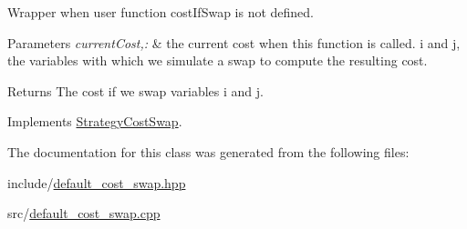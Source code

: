 \-Wrapper when user function cost\-If\-Swap is not defined. 


\begin{DoxyParams}{\-Parameters}
{\em current\-Cost,\-:} & the current cost when this function is called. i and j, the variables with which we simulate a swap to compute the resulting cost. \\
\hline
\end{DoxyParams}
\begin{DoxyReturn}{\-Returns}
\-The cost if we swap variables i and j. 
\end{DoxyReturn}


\-Implements \hyperlink{classStrategyCostSwap_a154e8db5c0e7cc22bd33942bbe4b8618}{\-Strategy\-Cost\-Swap}.



\-The documentation for this class was generated from the following files\-:\begin{DoxyCompactItemize}
\item 
include/\hyperlink{default__cost__swap_8hpp}{default\-\_\-cost\-\_\-swap.\-hpp}\item 
src/\hyperlink{default__cost__swap_8cpp}{default\-\_\-cost\-\_\-swap.\-cpp}\end{DoxyCompactItemize}
